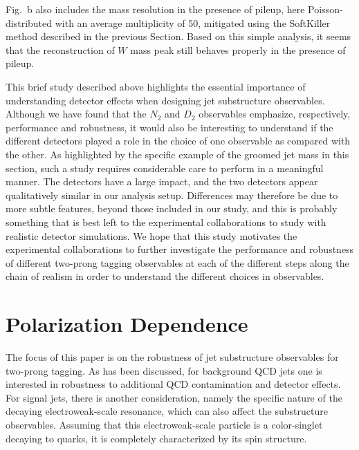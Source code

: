 \documentclass[11pt]{cernrep}
\begin{document}
Fig.~\label{jetsub_2prong_fig:mass-detector}b also includes the mass
resolution in the presence of pileup, here Poisson-distributed with an
average multiplicity of 50, mitigated using the SoftKiller method
described in the previous Section. Based on this simple analysis, it
seems that the reconstruction of $W$ mass peak still behaves properly
in the presence of pileup.


This brief study described above highlights the essential importance
of understanding detector effects when designing jet substructure
observables.
%
Although we have found that the $N_2$ and $D_2$ observables emphasize,
respectively, performance and robustness, it would also be interesting
to understand if the different detectors played a role in the choice
of one observable as compared with the other.
%
As highlighted by the specific example of the groomed jet mass in this section, such a study requires considerable care to perform in a meaningful manner.
%
The detectors have a large impact, and the two detectors appear qualitatively similar in our analysis setup.
%
Differences may therefore be due to more subtle features, beyond those included in our study, and this is probably something that is best left to the experimental collaborations to study with realistic detector simulations.
%
We hope that this study motivates the experimental collaborations to further investigate the performance and robustness of different two-prong tagging observables at each of the different steps along the chain of realism in order to understand the different choices in observables.



\section{Polarization Dependence}\label{jetsub_2prong_sec:polar}

The focus of this paper is on the robustness of jet substructure
observables for two-prong tagging.
%
As has been discussed, for
background QCD jets one is interested in robustness to additional QCD
contamination and detector effects.
%
For signal jets, there is another consideration, namely the specific nature of the decaying electroweak-scale resonance, which can also affect the substructure observables.
%
Assuming that this electroweak-scale particle is a color-singlet decaying to quarks, it is completely
characterized by its spin structure.
\end{document}

